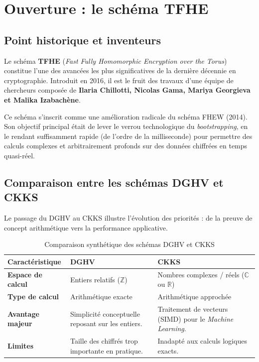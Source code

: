 \chapter{Ouverture : le schéma TFHE}

\section{Point historique et inventeurs}

Le schéma \textbf{TFHE} (\textit{Fast Fully Homomorphic Encryption over the Torus}) constitue l'une des avancées les plus significatives de la dernière décennie en cryptographie. Introduit en 2016, il est le fruit des travaux d'une équipe de chercheurs composée de \textbf{Ilaria Chillotti, Nicolas Gama, Mariya Georgieva et Malika Izabachène}. 

Ce schéma s'inscrit comme une amélioration radicale du schéma FHEW (2014). Son objectif principal était de lever le verrou technologique du \textit{bootstrapping}, en le rendant suffisamment rapide (de l'ordre de la milliseconde) pour permettre des calculs complexes et arbitrairement profonds sur des données chiffrées en temps quasi-réel.

\section{Comparaison entre les schémas DGHV et CKKS}

Le passage du DGHV au CKKS illustre l'évolution des priorités : de la preuve de concept arithmétique vers la performance applicative.

\begin{table}[h!]
\centering
\renewcommand{\arraystretch}{1.5}
\begin{tabular}{|l|p{5cm}|p{5cm}|}
\hline
\textbf{Caractéristique} & \textbf{DGHV} & \textbf{CKKS} \\ \hline
\textbf{Espace de calcul} & Entiers relatifs ($\mathbb{Z}$) & Nombres complexes / réels ($\mathbb{C}$ ou $\mathbb{R}$) \\ \hline
\textbf{Type de calcul} & Arithmétique exacte & Arithmétique approchée \\ \hline
\textbf{Avantage majeur} & Simplicité conceptuelle reposant sur les entiers. & Traitement de vecteurs (SIMD) pour le \textit{Machine Learning}. \\ \hline
\textbf{Limites} & Taille des chiffrés trop importante en pratique. & Inadapté aux calculs logiques exacts. \\ \hline
\end{tabular}
\caption{Comparaison synthétique des schémas DGHV et CKKS}
\end{table}

